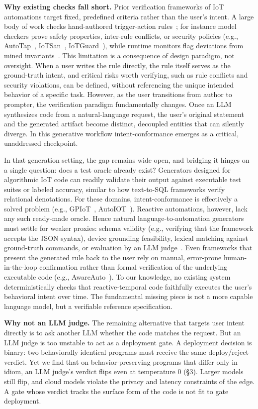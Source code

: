 \documentclass[sigconf,nonacm,anonymous,review]{acmart}
\begin{document}
\textbf{Why existing checks fall short.}
Prior verification frameworks of IoT automations target fixed, predefined criteria rather than the user's intent. A large body of work checks hand-authored trigger-action rules~\cite{ur2014}; for instance model checkers prove safety properties, inter-rule conflicts, or security policies (e.g., AutoTap~\cite{autotap}, IoTSan~\cite{iotsan}, IoTGuard~\cite{iotguard}), while runtime monitors flag deviations from mined invariants~\cite{hawatcher}. This limitation is a consequence of design paradigm, not oversight. When a user writes the rule directly, the rule itself serves as the ground-truth intent, and critical risks worth verifying, such as rule conflicts and security violations, can be defined, without referencing the unique intended behavior of a specific task.
However, as the user transitions from author to prompter, the verification paradigm fundamentally changes. Once an LLM synthesizes code from a natural-language request, the user’s original statement and the generated artifact become distinct, decoupled entities that can silently diverge. In this generative workflow intent-conformance emerges as a critical, unaddressed checkpoint.

In that generation setting, the gap remains wide open, and bridging it hinges on a single question:
does a test oracle already exist? Generators designed for algorithmic IoT code can readily validate their output against executable test suites or labeled accuracy, similar to how text-to-SQL frameworks verify relational denotations. For these domains, intent-conformance is effectively a solved problem (e.g., GPIoT~\cite{gpiot}, AutoIOT~\cite{autoiot_mobicom}). Reactive automations, however, lack any such ready-made oracle. Hence natural language-to-automation generators must settle for weaker proxies: schema validity (e.g., verifying that the framework accepts the JSON syntax), device grounding feasibility, lexical matching against ground-truth commands, or evaluation by an LLM judge~\cite{llmjudge}. Even frameworks that present the generated rule back to the user rely on manual, error-prone human-in-the-loop confirmation rather than formal verification of the underlying executable code (e.g., AwareAuto~\cite{awareauto}). To our knowledge, no existing system deterministically checks that reactive-temporal code faithfully executes the user's behavioral intent over time. The fundamental missing piece is not a more capable language model, but a verifiable reference specification.

\textbf{Why not an LLM judge.} The remaining alternative that targets user intent directly is to ask another LLM whether the code matches the request. But an LLM judge is too unstable to act as a deployment gate. A deployment decision is binary: two behaviorally identical programs must receive the same deploy/reject verdict. Yet we find that on behavior-preserving programs that differ only in idiom, an LLM judge's verdict flips even at temperature 0 (\S3). Larger models still flip, and cloud models violate the privacy and latency constraints of the edge. A gate whose verdict tracks the surface form of the code is not fit to gate deployment.
\end{document}
